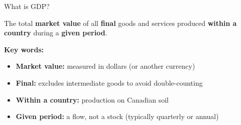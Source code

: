 \documentclass[aspectratio=169]{beamer}
\begin{document}

\begin{frame}{What is GDP?}
   \begin{defbox}
      The total \textbf{market value} of all \textbf{final} goods and services produced \textbf{within a country} during a \textbf{given period}.
   \end{defbox}
   \vspace{0.3cm}
   \textbf{Key words:}
   \vspace{0.15cm}
   \begin{itemize}
      \setlength\itemsep{0.15cm}
      \item \textbf{Market value:} measured in dollars (or another currency)
      \item \textbf{Final:} excludes intermediate goods to avoid double-counting
      \item \textbf{Within a country:} production on Canadian soil
      \item \textbf{Given period:} a flow, not a stock (typically quarterly or annual)
   \end{itemize}
\end{frame}
\end{document}
